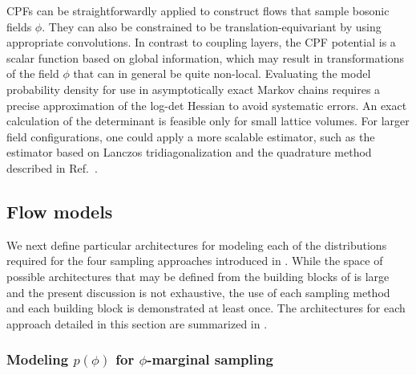 \documentclass[aps,prd,twocolumn,nofootinbib,superscriptaddress,preprintnumbers]{revtex4-1}
\begin{document}
CPFs can be straightforwardly applied to construct flows that sample bosonic fields $\phi$. They can also be constrained to be translation-equivariant by using appropriate convolutions. In contrast to coupling layers, the CPF potential is a scalar function based on global information, which may result in transformations of the field $\phi$ that can in general be quite non-local. Evaluating the model probability density for use in asymptotically exact Markov chains requires a precise approximation of the log-det Hessian to avoid systematic errors. An exact calculation of the determinant is feasible only for small lattice volumes. For larger field configurations, one could apply a more scalable estimator, such as the estimator based on Lanczos tridiagonalization and the quadrature method described in Ref.~\cite{ubaru2017fast}.


\subsection{Flow models}
\label{sec:flow-models}

We next define particular architectures for modeling each of the distributions required for the four sampling approaches introduced in . While the space of possible architectures that may be defined from the building blocks of  is large and the present discussion is not exhaustive, the use of each sampling method and each building block is demonstrated at least once. The architectures for each approach detailed in this section are summarized in .


\subsubsection{Modeling \texorpdfstring{$p(\phi)$}{p(phi)} for \texorpdfstring{$\phi$-marginal}{phi-marginal} sampling}
\label{sec:phi-marginal-modeling}
\end{document}
